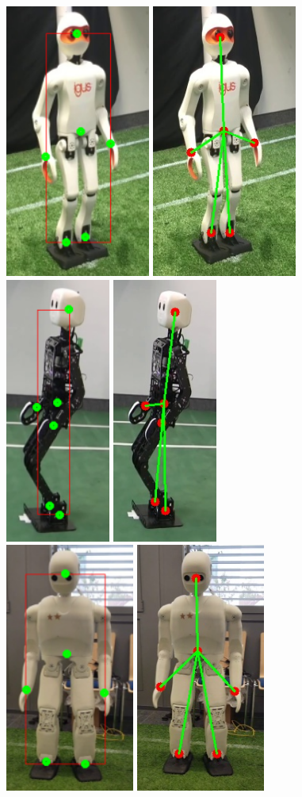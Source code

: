 \begin{figure}
  \includegraphics[width=.15\textwidth]{gambar/comp_with_gt/robot_1_gt.png}
  \includegraphics[width=.15\textwidth]{gambar/comp_with_gt/robot_1_res.png} \hfill%
  \includegraphics[width=.113\textwidth]{gambar/comp_with_gt/robot_2_gt.png}
  \includegraphics[width=.113\textwidth]{gambar/comp_with_gt/robot_2_res.png} \hfill%
  \includegraphics[width=.15\textwidth]{gambar/comp_with_gt/robot_3_gt.png}
  \includegraphics[width=.15\textwidth]{gambar/comp_with_gt/robot_3_res.png}

\end{figure}
